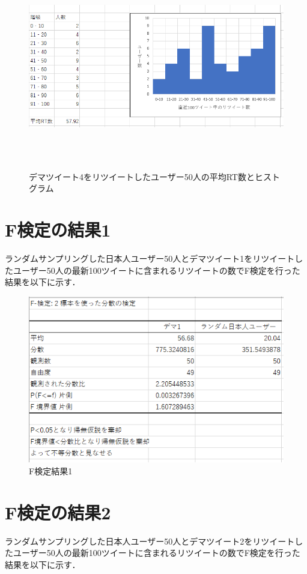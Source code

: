 \begin{figure}[htb]
\centering
\includegraphics[clip,width=15cm,height=9cm]{d4.png}
\caption{デマツイート4をリツイートしたユーザー50人の平均RT数とヒストグラム}\label{26}
\end{figure}
\clearpage

\section{F検定の結果1}
ランダムサンプリングした日本人ユーザー50人とデマツイート1をリツイートしたユーザー50人の最新100ツイートに含まれるリツイートの数でF検定を行った結果を以下に示す．

\begin{figure}[htb]
\centering
\includegraphics[width=13cm]{14.png}
\caption{F検定結果1}\label{27}
\end{figure}
\clearpage

\section{F検定の結果2}
ランダムサンプリングした日本人ユーザー50人とデマツイート2をリツイートしたユーザー50人の最新100ツイートに含まれるリツイートの数でF検定を行った結果を以下に示す．

